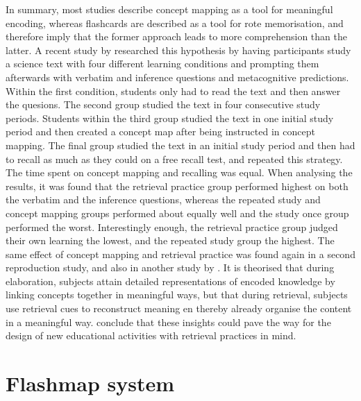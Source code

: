 In summary, most studies describe concept mapping as a tool for meaningful encoding, whereas flashcards are described as a tool for rote memorisation, and therefore imply that the former approach leads to more comprehension than the latter. A recent study by  researched this hypothesis by having participants study a science text with four different learning conditions and prompting them afterwards with verbatim and inference questions and metacognitive predictions. Within the first condition, students only had to read the text and then answer the quesions. The second group studied the text in four consecutive study periods. Students within the third group studied the text in one initial study period and then created a concept map after being instructed in concept mapping. The final group studied the text in an initial study period and then had to recall as much as they could on a free recall test, and repeated this strategy. The time spent on concept mapping and recalling was equal. When analysing the results, it was found that the retrieval practice group performed highest on both the verbatim and the inference questions, whereas the repeated study and concept mapping groups performed about equally well and the study once group performed the worst. Interestingly enough, the retrieval practice group judged their own learning the lowest, and the repeated study group the highest. The same effect of concept mapping and retrieval practice was found again in a second reproduction study, and also in another study by . It is theorised that during elaboration, subjects attain detailed representations of encoded knowledge by linking concepts together in meaningful ways, but that during retrieval, subjects use retrieval cues to reconstruct meaning en thereby already organise the content in a meaningful way.  conclude that these insights could pave the way for the design of new educational activities with retrieval practices in mind.

\section{Flashmap system}

\label{sec:intro_flashmap}

